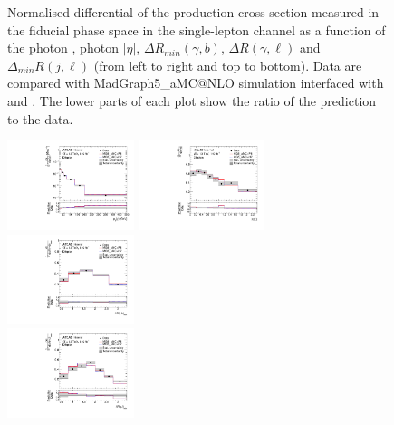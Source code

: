 \begin{figure}[ht]
  \caption{Normalised differential of the \tty production 
  cross-section measured in the fiducial phase space in the single-lepton
  channel as a function of the photon \pt, photon $|\eta|$, $\Delta R_{min}
  (\gamma, b)$, $\Delta R (\gamma, \ell)$ and $\Delta_{min} R (j, \ell)$ (from
  left to right and top to bottom). Data are compared with MadGraph5\_aMC@NLO
  simulation interfaced with \PYTHIA[8] and \HERWIG[7]. The lower parts of each
  plot show the ratio of the prediction to the data. }
  \label{fig:tty_prod_diff_Ljets_norm}
\end{figure}
\FloatBarrier

\begin{figure}[ht]
  \centering
  \includegraphics[width=0.33\textwidth]{figures/diff_xsec/normalized-unfolded-distributions/tty_prod_dilep/DL_tty_prod_pt_unfolded_normalized.pdf}%
  \includegraphics[width=0.33\textwidth]{figures/diff_xsec/normalized-unfolded-distributions/tty_prod_dilep/DL_tty_prod_eta_unfolded_normalized.pdf}%
  \includegraphics[width=0.33\textwidth]{figures/diff_xsec/normalized-unfolded-distributions/tty_prod_dilep/DL_tty_prod_drphb_unfolded_normalized.pdf}\\
  \includegraphics[width=0.33\textwidth]{figures/diff_xsec/normalized-unfolded-distributions/tty_prod_dilep/DL_tty_prod_drphl_unfolded_normalized.pdf}%

\end{figure}
